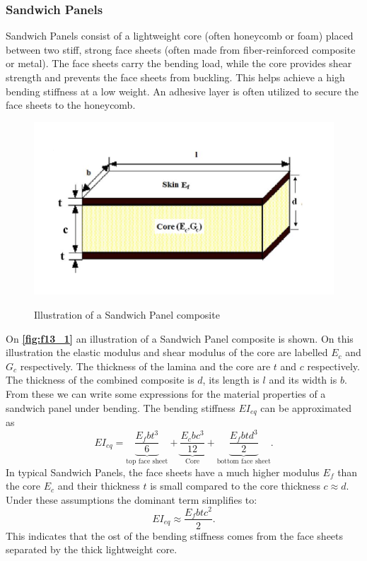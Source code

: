 \subsubsection{Sandwich Panels}
Sandwich Panels consist of a lightweight core (often honeycomb or foam) placed between two stiff, strong face sheets (often made from fiber-reinforced composite or metal). The face sheets carry the bending load, while the core provides shear strength and prevents the face sheets from buckling. This helps achieve a high bending stiffness at a low weight. An adhesive layer is often utilized to secure the face sheets to the honeycomb.

\begin{figure} [ht]
  \centering
  \caption{Illustration of a Sandwich Panel composite}
  \includegraphics[width=0.75\linewidth]{./figures/f13_1.png}
  \label{fig:f13_1}
\end{figure}
On \textbf{\autoref{fig:f13_1}} an illustration of a Sandwich Panel composite is shown. On this illustration the elastic modulus and shear modulus of the core are labelled $E_c$ and $G_c$ respectively. The thickness of the lamina and the core are $t$ and $c$ respectively. The thickness of the combined composite is $d$, its length is $l$ and its width is $b$. From these we can write some expressions for the material properties of a sandwich panel under bending. The bending stiffness $EI_{eq}$ can be approximated as
\[ 
  EI_{eq} = \underbrace{\frac{E_f b t^3}{6}}_{\text{top face sheet}} + \underbrace{\frac{E_c b c^3}{12}}_{\text{Core}} + \underbrace{\frac{E_f bt d^3}{2}}_{\text{bottom face sheet}}
.\]
In typical Sandwich Panels, the face sheets have a much higher modulus $E_f$ than the core $E_c$ and their thickness $t$ is small compared to the core thickness $c \approx d$. Under these assumptions the dominant term simplifies to:
\[ 
EI_{eq} \approx \frac{E_f bt c^2}{2}
.\]
This indicates that the ost of the bending stiffness comes from the face sheets separated by the thick lightweight core.

